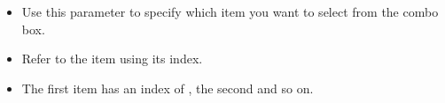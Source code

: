 \begin{itemize}
\item Use this parameter to specify which item you want to select from the combo box.
\item Refer to the item using its index.
\item The first item has an index of , the second  and so on.
\end{itemize}
